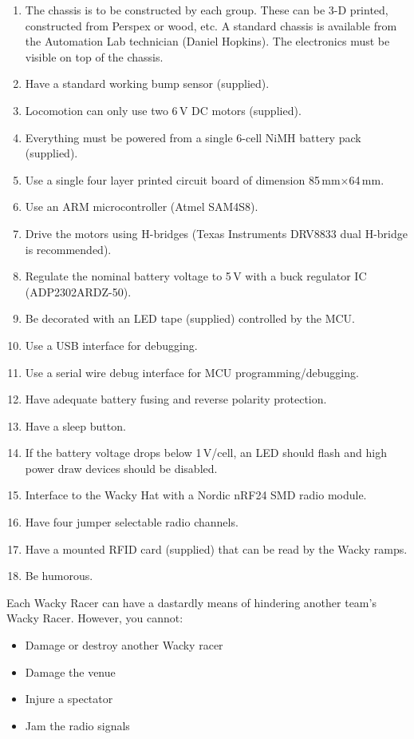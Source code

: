 \documentclass[11pt, a4paper]{article}
\begin{document}
\begin{enumerate}
\item The chassis is to be constructed by each group.  These can be
  3-D printed, constructed from Perspex or wood, etc.  A standard
  chassis is available from the Automation Lab technician (Daniel
  Hopkins).  The electronics must be visible on top of the chassis.
\item Have a standard working bump sensor (supplied).  
\item Locomotion can only use two 6\,V DC motors (supplied).
\item Everything must be powered from a single 6-cell NiMH battery pack (supplied).
\item Use a single four layer printed circuit board of dimension 85\,mm$\times$64\,mm.
\item Use an ARM microcontroller (Atmel SAM4S8).
\item Drive the motors using H-bridges (Texas Instruments DRV8833 dual
  H-bridge is recommended).
\item Regulate the nominal battery voltage to 5\,V with a buck
  regulator IC (ADP2302ARDZ-50).
\item Be decorated with an LED tape (supplied) controlled by the MCU.
\item Use a USB interface for debugging.
\item Use a serial wire debug interface for MCU programming/debugging.
\item Have adequate battery fusing and reverse polarity protection.
\item Have a sleep button.
\item If the battery voltage drops below 1\,V/cell, an LED should flash and high power draw devices should be disabled.
\item Interface to the Wacky Hat with a Nordic nRF24 SMD radio module.
\item Have four jumper selectable radio channels.  
\item Have a mounted RFID card (supplied) that can be read by the Wacky ramps.
\item Be humorous.    
\end{enumerate}


Each Wacky Racer can have a dastardly means of hindering another
team's Wacky Racer.  However, you cannot:
%
\begin{itemize}
\item Damage or destroy another Wacky racer
\item Damage the venue
\item Injure a spectator
\item Jam the radio signals  
\end{itemize}
\end{document}
